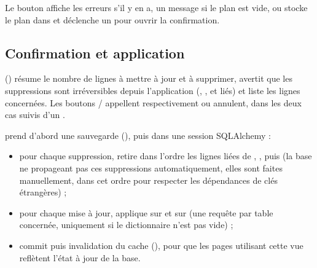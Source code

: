 \documentclass[letterpaper,10pt,english]{sphinxmanual}
\begin{document}
\sphinxAtStartPar
Le bouton  affiche les erreurs s’il y en a, un message  si le plan est
vide, ou stocke le plan dans  et déclenche un 
pour ouvrir la confirmation.


\subsection{Confirmation et application}
\label{\detokenize{5_Management:confirmation-et-application}}
\sphinxAtStartPar
{} () résume le nombre de lignes à mettre à jour et à
supprimer, avertit que les suppressions sont irréversibles depuis l’application (,
,  et  liés) et liste les lignes concernées. Les boutons
 /  appellent respectivement  ou annulent, dans les deux
cas suivis d’un .

\sphinxAtStartPar
{} prend d’abord une sauvegarde (),
puis dans une session SQLAlchemy :
\begin{itemize}
\item {} 
\sphinxAtStartPar
pour chaque suppression, retire dans l’ordre les lignes liées de , ,
 puis  (la base ne propageant pas ces suppressions automatiquement, elles
sont faites manuellement, dans cet ordre pour respecter les dépendances de clés étrangères) ;

\item {} 
\sphinxAtStartPar
pour chaque mise à jour, applique  sur  et  sur
 (une requête  par table concernée, uniquement si le dictionnaire n’est
pas vide) ;

\item {} 
\sphinxAtStartPar
commit puis invalidation du cache (), pour que les pages
utilisant cette vue reflètent l’état à jour de la base.

\end{itemize}
\end{document}

